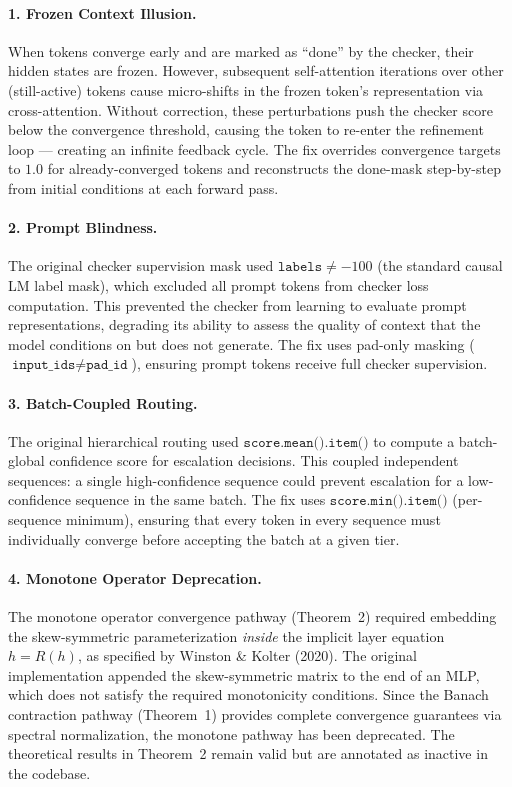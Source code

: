 \documentclass[11pt,a4paper]{article}
\theoremstyle{definition}
\begin{document}
\paragraph{1. Frozen Context Illusion.} When tokens converge early and are marked as ``done'' by the checker, their hidden states are frozen. However, subsequent self-attention iterations over other (still-active) tokens cause micro-shifts in the frozen token's representation via cross-attention. Without correction, these perturbations push the checker score below the convergence threshold, causing the token to re-enter the refinement loop --- creating an infinite feedback cycle. The fix overrides convergence targets to $1.0$ for already-converged tokens and reconstructs the done-mask step-by-step from initial conditions at each forward pass.

\paragraph{2. Prompt Blindness.} The original checker supervision mask used $\texttt{labels} \neq -100$ (the standard causal LM label mask), which excluded all prompt tokens from checker loss computation. This prevented the checker from learning to evaluate prompt representations, degrading its ability to assess the quality of context that the model conditions on but does not generate. The fix uses pad-only masking ($\texttt{input\_ids} \neq \texttt{pad\_id}$), ensuring prompt tokens receive full checker supervision.

\paragraph{3. Batch-Coupled Routing.} The original hierarchical routing used $\texttt{score.mean().item()}$ to compute a batch-global confidence score for escalation decisions. This coupled independent sequences: a single high-confidence sequence could prevent escalation for a low-confidence sequence in the same batch. The fix uses $\texttt{score.min().item()}$ (per-sequence minimum), ensuring that every token in every sequence must individually converge before accepting the batch at a given tier.

\paragraph{4. Monotone Operator Deprecation.} The monotone operator convergence pathway (Theorem~2) required embedding the skew-symmetric parameterization \textit{inside} the implicit layer equation $h = R(h)$, as specified by Winston \& Kolter (2020). The original implementation appended the skew-symmetric matrix to the end of an MLP, which does not satisfy the required monotonicity conditions. Since the Banach contraction pathway (Theorem~1) provides complete convergence guarantees via spectral normalization, the monotone pathway has been deprecated. The theoretical results in Theorem~2 remain valid but are annotated as inactive in the codebase.
\end{document}
